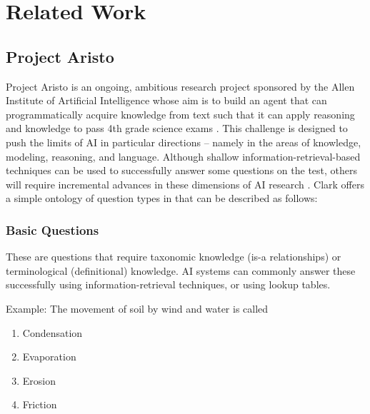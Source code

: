  
\chapter{Related Work}

\section{Project Aristo}

Project Aristo is an ongoing, ambitious research project sponsored by the Allen Institute of Artificial Intelligence whose aim is to build an agent that can programmatically acquire knowledge from text such that it can apply reasoning and knowledge to pass 4th grade science exams \cite{clark2015elementary}.  This challenge is designed to push the limits of AI in particular directions -- namely in the areas of knowledge, modeling, reasoning, and language.  Although shallow information-retrieval-based techniques can be used to successfully answer some questions on the test, others will require incremental advances in these dimensions of AI research \cite{clark2015elementary}.  Clark \cite{clark2015elementary} offers a simple ontology of question types in that can be described as follows:


\subsection{Basic Questions}

These are questions that require taxonomic knowledge (is-a relationships) or terminological (definitional) knowledge.  AI systems can commonly answer these successfully using information-retrieval techniques, or using lookup tables.  


Example: The movement of soil by wind and water is called \cite{clark2015elementary}

\begin{enumerate}[label=\Alph*.]
\item Condensation
\item Evaporation
\item Erosion
\item Friction
\end{enumerate}

